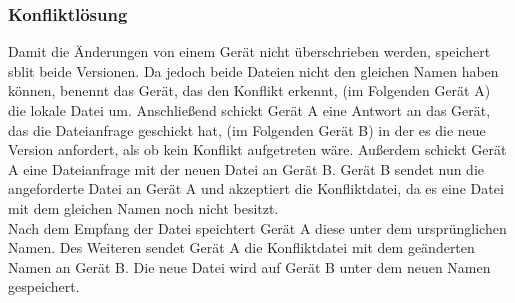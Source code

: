 \subsubsection{Konfliktlösung}
Damit die Änderungen von einem Gerät nicht überschrieben werden, speichert sblit beide Versionen. Da jedoch beide Dateien nicht den gleichen Namen haben können, benennt das Gerät, das den Konflikt erkennt, (im Folgenden Gerät A) die lokale Datei um. Anschließend schickt Gerät A eine Antwort an das Gerät, das die Dateianfrage geschickt hat,  (im Folgenden Gerät B) in der es die neue Version anfordert, als ob kein Konflikt aufgetreten wäre. Außerdem schickt Gerät A eine Dateianfrage mit der neuen Datei an Gerät B. Gerät B sendet nun die angeforderte Datei an Gerät A und akzeptiert die Konfliktdatei, da es eine Datei mit dem gleichen Namen noch nicht besitzt. \\
Nach dem Empfang der Datei speichtert Gerät A diese unter dem ursprünglichen Namen. Des Weiteren sendet Gerät A die Konfliktdatei mit dem geänderten Namen an Gerät B. Die neue Datei wird auf Gerät B unter dem neuen Namen gespeichert.
